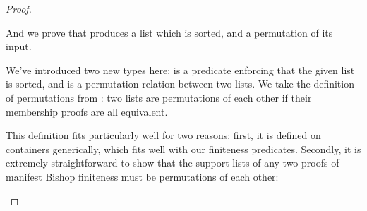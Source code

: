 \begin{proof}
\begin{minipage}{\linewidth}
\begin{multicols}{2}
  \begin{agdalisting}
  \end{agdalisting} \columnbreak \vfill \null \vfill
  \begin{agdalisting}
  \end{agdalisting} \vfill \null
\end{multicols}
\end{minipage} \noindent
And we prove that  produces a list which is sorted, and a
permutation of its input.
\begin{multicols}{2}
  \begin{agdalisting}
  \end{agdalisting} \columnbreak
  \begin{agdalisting}
  \end{agdalisting}
\end{multicols} \vspace{-\baselineskip}
We've introduced two new types here:  is a predicate
enforcing that the given list is sorted, and
\AgdaFunction{\(\leftrightsquigarrow\)} is a permutation relation between two
lists.
We take the definition of permutations from
\cite{danielssonBagEquivalenceProofRelevant2012}: two lists are permutations of
each other if their membership proofs are all equivalent.
\begin{agdalisting}
\end{agdalisting}
This definition fits particularly well for two reasons: first, it is defined on
containers generically, which fits well with our finiteness predicates.
Secondly, it is extremely straightforward to show that the support lists of any
two proofs of manifest Bishop finiteness must be permutations of each other:
\begin{agdalisting}
\end{agdalisting}


\end{proof}
